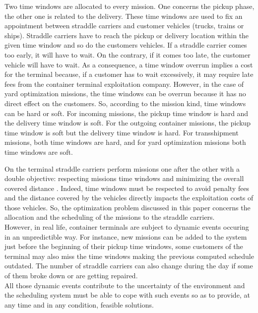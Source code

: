 \documentclass[a4paper,12pt]{article}
\begin{document}
Two time windows are allocated to every mission. One concerns the pickup phase, the other one is related to the delivery. These time windows are used to fix an appointment between straddle carriers and customer vehicles (trucks, trains or ships). Straddle carriers have to reach the pickup or delivery location within the given time window and so do the customers vehicles. If a straddle carrier comes too early, it will have to wait. On the contrary, if it comes too late, the customer vehicle will have to wait. As a consequence, a time window overrun implies a cost for the terminal because, if a customer has to wait excessively, it may require late fees from the container terminal exploitation company. However, in the case of yard optimization missions, the time windows can be overrun because it has no direct effect on the customers. So, according to the mission kind, time windows can be hard or soft. For incoming missions, the pickup time window is hard and the delivery time window is soft. For the outgoing container missions, the pickup time window is soft but the delivery time window is hard. For transshipment missions, both time windows are hard, and for yard optimization missions both time windows are soft. 

On the terminal straddle carriers perform missions one after the other with a double objective: respecting missions time windows and minimizing the overall covered distance \cite{Lesauvage2009}. Indeed, time windows must be respected to avoid penalty fees and the distance covered by the vehicles directly impacts the exploitation costs of those vehicles. %
So, the optimization problem discussed in this paper concerns the allocation and the scheduling of the missions to the straddle carriers.\\

However, in real life, container terminals are subject to dynamic events occuring in an unpredictible way. For instance, new missions can be added to the system just before the beginning of their pickup time windows, some customers of the terminal may also miss the time windows making the previous computed schedule outdated. The number of straddle carriers can also change during the day if some of them broke down or are getting repaired.\\

All those dynamic events contribute to the uncertainty of the environment and the scheduling system must be able to cope with such events so as to provide, at any time and in any condition, feasible solutions.\\
\end{document}
